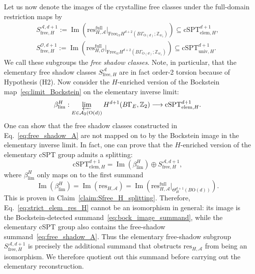 \documentclass[aps,prx,reprint,superscriptaddress,twocolumn,amsmath,amssymb,amsfonts, nofootinbib]{revtex4-2}
\newcommand{\res}{\text{res}}
\theoremstyle{apsstyle}
\begin{document}
Let us now denote the images of the crystalline free classes under the full-domain restriction maps by
\begin{gather} 
\label{eq:free_shadow_A}
S_{\mathrm{free},H}^{\mathcal A, d+1} := \operatorname{Im}\left( \res_{H,\mathcal A}^{\mathrm{full}}\big|_{\mathrm{Free}_{\mathrm{cr}} H^{d+2}(B\Gamma_{\mathrm{O}(d)};\mathbb Z_{w_1})} \right) \subseteq \mathrm{cSPT}^{d+1}_{\mathrm{elem},H},\\
S_{\mathrm{free},H}^{\mathcal O, d+1} := \operatorname{Im}\left( \res_{H,\mathcal O}^{\mathrm{full}}\big|_{\mathrm{Free}_{\mathrm{cr}} H^{d+2}(B\Gamma_{\mathrm{O}(d)};\mathbb Z_{w_1})} \right) \subseteq \mathrm{cSPT}^{d+1}_{\mathrm{univ},H}.
\label{eq:free_shadow_O}
\end{gather}
We call these subgroups the \textit{free shadow classes}. Note, in particular, that the elementary free shadow classes $S_{\mathrm{free},H}^{\mathcal A}$ are in fact order-2 torsion because of Hypothesis (H2). Now consider the $H$-enriched version of the Bockstein map~\eqref{eq:limit_Bockstein} on the elementary inverse limit:
\begin{equation*}
    \beta^{H}_{\lim}: \varprojlim\limits_{E\in\mathcal A_{2}(\mathrm{O}(d))} H^{d+1}(B\Gamma_{E},\mathbb Z_{2}) \longrightarrow \mathrm{cSPT}^{d+1}_{\mathrm{elem}, H}.
\end{equation*}
One can show that the free shadow classes constructed in Eq.~\ref{eq:free_shadow_A} are not mapped on to by the Bockstein image in the elementary inverse limit. In fact, one can prove that the $H$-enriched version of the elementary cSPT group admits a splitting: 
\begin{equation}
\label{eq:cspt_splitting}
\mathrm{cSPT}_{\mathrm{elem},H}^{d+1} = \operatorname{Im}\left(\beta_{\lim}^{H}\right)
\oplus S_{\mathrm{free},H}^{\mathcal A, d+1},
\end{equation}
where $\beta_{\lim}^{H}$ only maps on to the first summand
\begin{equation} \operatorname{Im}(\beta_{\lim}^{H}) = \operatorname{Im}\left( \res_{H,\mathcal A}\right)=\operatorname{Im}\left( \res_{H,\mathcal A}^{\mathrm{full}}\bigr\vert_{\Theta^{d+1}_{H}(B\mathrm{O}(d))}\right).
\label{eq:bock_image_summand}
\end{equation} 
This is proven in Claim~\ref{claim:Sfree_H_splitting}. Therefore, Eq.~\eqref{eq:strict_elem_res_H} cannot be an isomorphism in general: its image is the Bockstein-detected summand~\eqref{eq:bock_image_summand}, while the elementary cSPT group also contains the free-shadow summand~\eqref{eq:free_shadow_A}. Thus the elementary free-shadow subgroup $S_{\mathrm{free},H}^{\mathcal A,d+1}$ is precisely the additional summand that obstructs $\res_{H,\mathcal A}$ from being an isomorphism. We therefore quotient out this summand before carrying out the
elementary reconstruction.
\end{document}
